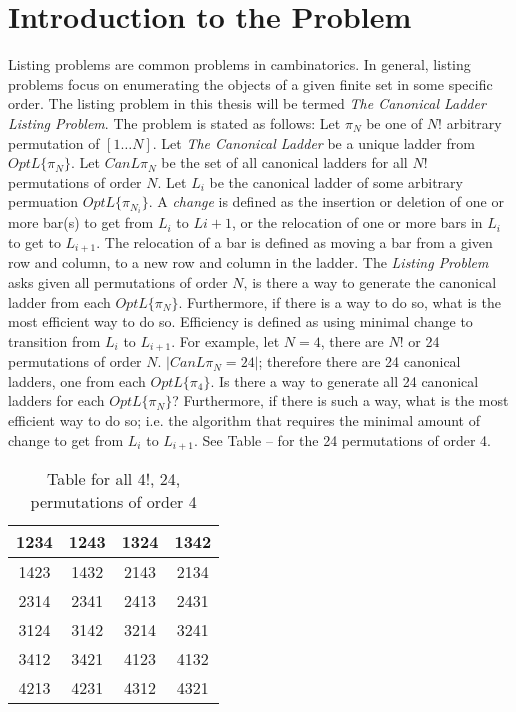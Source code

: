 \section{Introduction to the Problem}
Listing problems are common problems in cambinatorics. In general, listing problems 
focus on enumerating the objects of a given finite set in some specific order. The listing problem in this thesis 
will be termed \emph{The Canonical Ladder Listing Problem}. The problem is stated as follows: Let $\pi_{N}$ be one of $N!$ arbitrary permutation of $[1 \dots N]$. 
Let \emph{The Canonical Ladder} be a unique ladder from $OptL\{\pi_{N}\}$. Let $CanL{\pi_{N}}$ be the set of all canonical ladders for 
all $N!$ permutations of order $N$. Let $L_{i}$ be the canonical ladder of some arbitrary permuation $OptL\{\pi_{N_{i}}\}$. A \emph{change} is defined as the insertion or 
deletion of one or more bar(s) to get from $L_{i}$ to $L{i+1}$, or the relocation of one or more bars in $L_{i}$ to get to $L_{i+1}$. The relocation of a bar 
is defined as moving a bar from a given row and column, to a new row and column in the ladder. The \emph{Listing Problem} asks given all permutations of 
order $N$, is there a way to generate the canonical ladder from each $OptL\{\pi_{N}\}$. 
Furthermore, if there is a way to do so, what is the most efficient way to do so. Efficiency is defined as 
using minimal change to transition from $L_{i}$ to $L_{i+1}$. For example, let $N=4$, there are $N!$ or 24 permutations 
of order $N$. $|CanL{\pi_{N}}=24|$; therefore there are 24 canonical ladders, one from each $OptL\{\pi_{4}\}$. Is there a way to generate 
all 24 canonical ladders for each $OptL\{\pi_{N}\}$? Furthermore, if there is such a way, what is the most efficient way 
to do so; i.e. the algorithm that requires the minimal amount of change to get from $L_{i}$ to $L_{i+1}$. See Table -- for 
the 24 permutations of order 4.
\begin{table}[]
    \begin{center}
       \begin{tabular}{|c |c |c |c |}
        \hline
        1234 & 1243 & 1324 & 1342 \\ \hline
        1423 & 1432 & 2143 & 2134 \\ \hline 
        2314 & 2341 & 2413 & 2431 \\ \hline 
        3124 & 3142 & 3214 & 3241 \\ \hline 
        3412 & 3421 & 4123 & 4132 \\ \hline 
        4213 & 4231 & 4312 & 4321 \\ \hline 
        
    \end{tabular}
    \caption{Table for all 4!, 24, permutations of order 4} 
    \end{center}

 \end{table}



